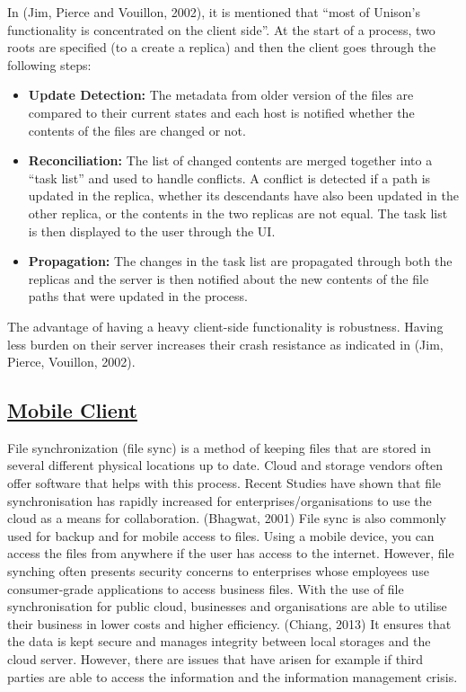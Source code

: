 \documentclass{article}
\begin{document}
In (Jim, Pierce and Vouillon, 2002), it is mentioned that “most of Unison’s functionality is concentrated on the client side”. At the start of a process, two roots are specified (to a create a replica) and then the client goes through the following steps:
\begin{itemize}
\item \textbf{Update Detection:} The metadata from older version of the files are compared to their current states and each host is notified whether the contents of the files are changed or not.
\item \textbf{Reconciliation:} The list of changed contents are merged together into a “task list” and used to handle conflicts. A conflict is detected if a path is updated in the replica, whether its descendants have also been updated in the other replica, or the contents in the two replicas are not equal. The task list is then displayed to the user through the UI. 
\item \textbf{Propagation:} The changes in the task list are propagated through both the replicas and the server is then notified about the new contents of the file paths that were updated in the process. 
\end{itemize}
The advantage of having a heavy client-side functionality is robustness. Having less burden on their server increases their crash resistance as indicated in (Jim, Pierce, Vouillon, 2002). 

\subsection{\underline{Mobile Client}}
File synchronization (file sync) is a method of keeping files that are stored in several different physical locations up to date. Cloud and storage vendors often offer software that helps with this process. Recent Studies have shown that file synchronisation has rapidly increased for enterprises/organisations to use the cloud as a means for collaboration. (Bhagwat, 2001) File sync is also commonly used for backup and for mobile access to files. Using a mobile device, you can access the files from anywhere if the user has access to the internet. However, file synching often presents security concerns to enterprises whose employees use consumer-grade applications to access business files. With the use of file synchronisation for public cloud, businesses and organisations are able to utilise their business in lower costs and higher efficiency. (Chiang, 2013) It ensures that the data is kept secure and manages integrity between local storages and the cloud server. However, there are issues that have arisen for example if third parties are able to access the information and the information management crisis. 
\end{document}
